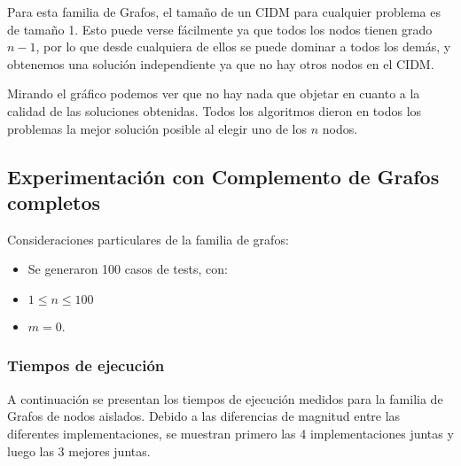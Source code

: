 Para esta familia de Grafos, el tamaño de un CIDM para cualquier problema es de tamaño 1. Esto puede verse fácilmente ya que todos los nodos tienen grado $n-1$, por lo que desde cualquiera de ellos se puede dominar a todos los demás, y obtenemos una solución independiente ya que no hay otros nodos en el CIDM.

Mirando el gráfico podemos ver que no hay nada que objetar en cuanto a la calidad de las soluciones obtenidas. Todos los algoritmos dieron en todos los problemas la mejor solución posible al elegir uno de los $n$ nodos.

\subsection{Experimentación con Complemento de Grafos completos}

Consideraciones particulares de la familia de grafos:
\begin{itemize}
    \item Se generaron 100 casos de tests, con:
    \item $1 \leq n \leq 100$
    \item $m = 0$.
\end{itemize}

\subsubsection{Tiempos de ejecución}

A continuación se presentan los tiempos de ejecución medidos para la familia de Grafos de nodos aislados. Debido a las diferencias de magnitud entre las diferentes implementaciones, se muestran primero las 4 implementaciones juntas y  luego las 3 mejores juntas.

